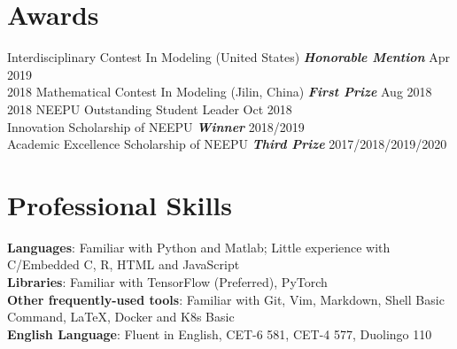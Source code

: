 \documentclass{my_cv}
\begin{document}
\section{Awards}
 Interdisciplinary Contest In Modeling (United States) \textbf{\emph{Honorable Mention}} \hfill Apr 2019\\
2018 Mathematical Contest In Modeling (Jilin, China) \textbf{\emph{First Prize}} \hfill Aug 2018\\
2018 NEEPU Outstanding Student Leader \hfill Oct 2018\\
Innovation Scholarship of NEEPU \textbf{\emph{Winner}} \hfill 2018/2019\\
Academic Excellence Scholarship of NEEPU \textbf{\emph{Third Prize}} \hfill 2017/2018/2019/2020

\hspace*{\fill}

\section{Professional Skills}
\noindent \textbf{Languages}: Familiar with Python and Matlab; Little experience with C/Embedded C, R, HTML and JavaScript \\
\textbf{Libraries}: Familiar with TensorFlow (Preferred), PyTorch \\
\textbf{Other frequently-used tools}: Familiar with Git, Vim, Markdown, Shell Basic Command, \LaTeX, Docker and K8s Basic \\
\textbf{English Language}: Fluent in English, CET-6 581, CET-4 577, Duolingo 110
\end{document}
